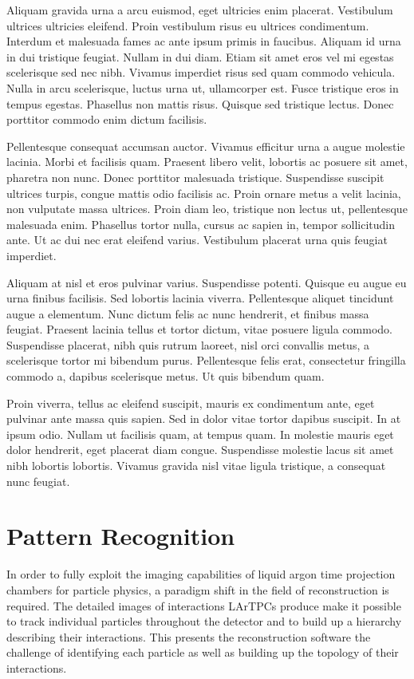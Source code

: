 Aliquam gravida urna a arcu euismod, eget ultricies enim placerat. Vestibulum ultrices ultricies eleifend. Proin vestibulum risus eu ultrices condimentum. Interdum et malesuada fames ac ante ipsum primis in faucibus. Aliquam id urna in dui tristique feugiat. Nullam in dui diam. Etiam sit amet eros vel mi egestas scelerisque sed nec nibh. Vivamus imperdiet risus sed quam commodo vehicula. Nulla in arcu scelerisque, luctus urna ut, ullamcorper est. Fusce tristique eros in tempus egestas. Phasellus non mattis risus. Quisque sed tristique lectus. Donec porttitor commodo enim dictum facilisis.

Pellentesque consequat accumsan auctor. Vivamus efficitur urna a augue molestie lacinia. Morbi et facilisis quam. Praesent libero velit, lobortis ac posuere sit amet, pharetra non nunc. Donec porttitor malesuada tristique. Suspendisse suscipit ultrices turpis, congue mattis odio facilisis ac. Proin ornare metus a velit lacinia, non vulputate massa ultrices. Proin diam leo, tristique non lectus ut, pellentesque malesuada enim. Phasellus tortor nulla, cursus ac sapien in, tempor sollicitudin ante. Ut ac dui nec erat eleifend varius. Vestibulum placerat urna quis feugiat imperdiet.

Aliquam at nisl et eros pulvinar varius. Suspendisse potenti. Quisque eu augue eu urna finibus facilisis. Sed lobortis lacinia viverra. Pellentesque aliquet tincidunt augue a elementum. Nunc dictum felis ac nunc hendrerit, et finibus massa feugiat. Praesent lacinia tellus et tortor dictum, vitae posuere ligula commodo. Suspendisse placerat, nibh quis rutrum laoreet, nisl orci convallis metus, a scelerisque tortor mi bibendum purus. Pellentesque felis erat, consectetur fringilla commodo a, dapibus scelerisque metus. Ut quis bibendum quam.

Proin viverra, tellus ac eleifend suscipit, mauris ex condimentum ante, eget pulvinar ante massa quis sapien. Sed in dolor vitae tortor dapibus suscipit. In at ipsum odio. Nullam ut facilisis quam, at tempus quam. In molestie mauris eget dolor hendrerit, eget placerat diam congue. Suspendisse molestie lacus sit amet nibh lobortis lobortis. Vivamus gravida nisl vitae ligula tristique, a consequat nunc feugiat.

\section{Pattern Recognition}
In order to fully exploit the imaging capabilities of liquid argon time projection chambers for particle physics, a paradigm shift in the field of reconstruction is required.  The detailed images of interactions LArTPCs produce make it possible to track individual particles throughout the detector and to build up a hierarchy describing their interactions.  This presents the reconstruction software the challenge of identifying each particle as well as building up the topology of their interactions.

